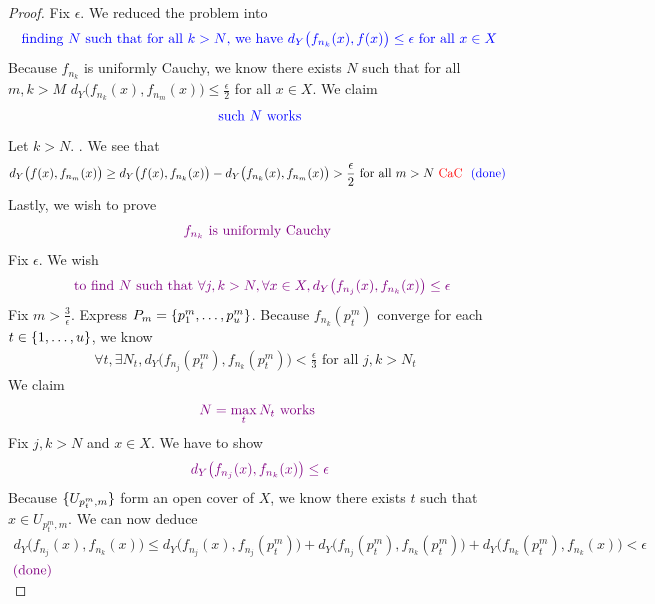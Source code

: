 \documentclass{report}
\begin{document}
\begin{proof}
Fix $\epsilon $. We reduced the problem into 
\begin{align*}
\textcolor{blue}{\text{ finding  $N$ such that for all $k>N$, we have  $d_Y\big(f_{n_k}(x), f(x)\big)\leq \epsilon $ for all $x\in X$ }}
\end{align*}
Because $f_{n_k}$ is uniformly Cauchy, we know there exists $N$ such that for all $m,k>M$ $d_Y\big(f_{n_k}(x),f_{n_m}(x) \big)\leq \frac{\epsilon}{2}$ for all $x \in X$. We claim 
\begin{align*}
 \textcolor{blue}{\text{ such $N$ works }}
\end{align*}
Let $k>N$.  . We see that 
 \begin{align*}
   d_Y\big(f(x),f_{n_m}(x) \big)\geq d_Y\big(f(x),f_{n_k}(x)\big)-d_Y\big(f_{n_k}(x),f_{n_m}(x) \big)>\frac{\epsilon}{2}\text{ for all $m>N\text{ \textcolor{red}{CaC} } \textcolor{blue}{\text{ (done) }}$} 
\end{align*}
Lastly, we wish to prove 
\begin{align*}
\textcolor{violet}{f_{n_k}\text{ is uniformly Cauchy }}
\end{align*}
Fix $\epsilon $. We wish  
\begin{align*}
\textcolor{violet}{\text{ to find }N\text{ such that }\forall j,k >N,\forall x\in X, d_Y\big(f_{n_j}(x),f_{n_k}(x)\big)\leq \epsilon  }
\end{align*}
Fix $m > \frac{3}{\epsilon }$. Express $P_m=\{ p^m_1,\dots ,p^m_u \}$. Because $f_{n_k}(p^m_t)$ converge for each $t \in \{ 1,\dots ,u \}$, we know 
\begin{align*}
\forall t , \exists N_t, d_Y\big(f_{n_j}(p_t^m),f_{n_k}(p_t^m) \big)<\frac{\epsilon}{3}\text{ for all $j,k>N_t$ }
\end{align*}
We claim 
\begin{align*}
\textcolor{violet}{N=\max_t N_t\text{ works }}
\end{align*}
Fix $j,k>N$ and $x \in X$. We have to show 
\begin{align*}
  \textcolor{violet}{d_Y\big(f_{n_j}(x),f_{n_k}(x) \big)\leq \epsilon}
\end{align*}
Because $\{ U_{p_t^m,m} \}$ form an open cover of $X$, we know there exists  $t$ such that $x \in U_{p_t^m,m}$. We can now deduce 
\begin{align*}
d_Y\big(f_{n_j}(x),f_{n_k}(x) \big)\leq d_Y\big(f_{n_j}(x),f_{n_j}(p_t^m) \big)+d_Y\big(f_{n_j}(p_t^m),f_{n_k}(p_t^m) \big)+d_Y\big(f_{n_k}(p_t^m),f_{n_k}(x) \big)<\epsilon 
\end{align*}
$\textcolor{violet}{\text{ (done) }}$\\

\end{proof}
\end{document}
